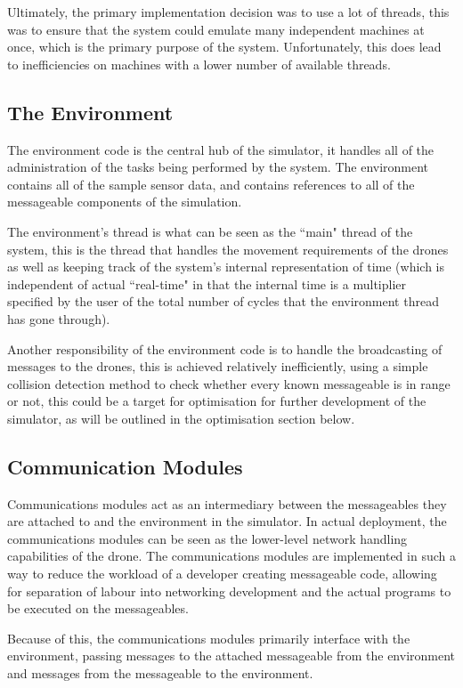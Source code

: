 	Ultimately, the primary implementation decision was to use a lot of threads, this was to ensure that
	the system could emulate many independent machines at once, which is the primary purpose of the system.
	Unfortunately, this does lead to inefficiencies on machines with a lower number of available threads.

	\subsection{The Environment}
		The environment code is the central hub of the simulator, it handles all of the administration
		of the tasks being performed by the system. The environment contains all of the sample sensor
		data, and contains references to all of the messageable components of the simulation.

		The environment's thread is what can be seen as the ``main" thread of the system, this is the
		thread that handles the movement requirements of the drones as well as keeping track of the
		system's internal representation of time (which is independent of actual ``real-time" in that
		the internal time is a multiplier specified by the user of the total number of cycles that the
		environment thread has gone through).

		Another responsibility of the environment code is to handle the broadcasting of messages to
		the drones, this is achieved relatively inefficiently, using a simple collision detection
		method to check whether every known messageable is in range or not, this could be a target
		for optimisation for further development of the simulator, as will be outlined in the optimisation
		section below.

	\subsection{Communication Modules}
		Communications modules act as an intermediary between the messageables they are attached to and
		the environment in the simulator. In actual deployment, the communications modules can be seen as
		the lower-level network handling capabilities of the drone. The communications modules are implemented
		in such a way to reduce the workload of a developer creating messageable code, allowing for separation
		of labour into networking development and the actual programs to be executed on the messageables.

		Because of this, the communications modules primarily interface with the environment, passing messages
		to the attached messageable from the environment and messages from the messageable to the environment.

